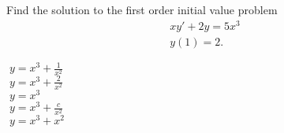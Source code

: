 \documentclass[12pt]{amsart}
\begin{document}
\begin{exam}
\begin{problem}
 Find the solution to the first order initial value problem
 \begin{gather*}
  xy' + 2y = 5x^{3}
  \\
  y(1) = 2.
  \end{gather*}
%
\begin{answers}{1}
$\;y = x^{3} + \frac{1}{x^{2}}$ \\
$\;y=x^{3} + \frac{2}{x^{2}}$ \\
$\;y=x^{3}$ \\
$\;y=x^{3} + \frac{c}{x^{2}}$ \\
$\;y = x^{3} + x^{2}$ \\
\end{answers}
\end{problem}









\end{exam}

\makemarkedanswersheet
\end{document}
